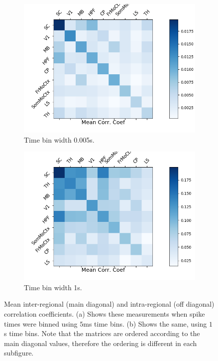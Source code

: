   \begin{figure}[h]
    \begin{subfigure}[h]{0.5\linewidth}
      \centering
      \includegraphics[width=\linewidth]{figures/eight_probe/Krebs_0p005_corr_matrix.png}
      \caption{Time bin width 0.005s.}
      \label{fig:short_bin_corr_matrix}
    \end{subfigure}
    \begin{subfigure}[h]{0.5\linewidth}
      \centering
      \includegraphics[width=\linewidth]{figures/eight_probe/Krebs_1p0_corr_matrix.png}
      \caption{Time bin width 1s.}
      \label{fig:long_bin_corr_matrix}
    \end{subfigure}
    \caption{Mean inter-regional (main diagonal) and intra-regional (off diagonal) correlation coefficients. (a) Shows these measurements when spike times were binned using $5$ms time bins. (b) Shows the same, using $1$s time bins. Note that the matrices are ordered according to the main diagonal values, therefore the ordering is different in each subfigure.}
    \label{fig:corr_matrices}
  \end{figure}

